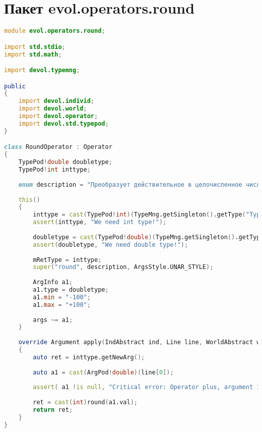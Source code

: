 \documentclass[russian,utf8,emptystyle]{eskdtext}
\begin{document}
\section{Пакет evol.operators.round}
\begin{lstlisting}[language=D]
module evol.operators.round;

import std.stdio;
import std.math;

import devol.typemng;

public
{
    import devol.individ;
    import devol.world;
    import devol.operator;
    import devol.std.typepod;
}

class RoundOperator : Operator
{
    TypePod!double doubletype;
    TypePod!int inttype;
    
    enum description = "Преобразует действительное в целочисленное число с помощью математического округления.";
    
    this()
    {
        inttype = cast(TypePod!int)(TypeMng.getSingleton().getType("Typeint"));
        assert(inttype, "We need int type!");
        
        doubletype = cast(TypePod!double)(TypeMng.getSingleton().getType("Typedouble"));
        assert(doubletype, "We need double type!");
        
        mRetType = inttype;
        super("round", description, ArgsStyle.UNAR_STYLE);
        
        ArgInfo a1;
        a1.type = doubletype;
        a1.min = "-100";
        a1.max = "+100";
        
        args ~= a1;
    }
    
    override Argument apply(IndAbstract ind, Line line, WorldAbstract world)
    {
        auto ret = inttype.getNewArg();
        
        auto a1 = cast(ArgPod!double)(line[0]);
        
        assert( a1 !is null, "Critical error: Operator plus, argument 1 isn't a right value!");
        
        ret = cast(int)round(a1.val);
        return ret;
    }   
}
\end{lstlisting}
\end{document}
